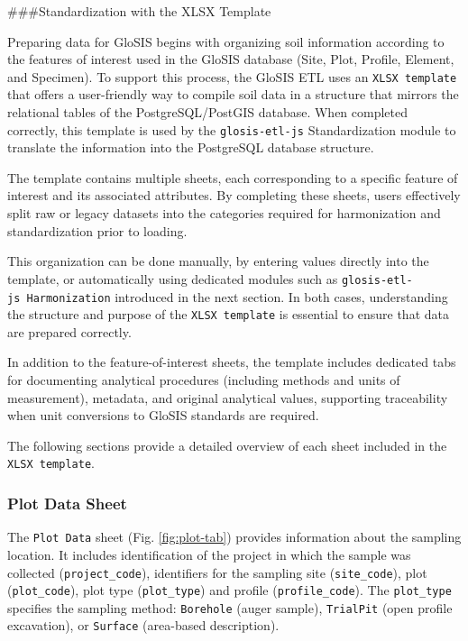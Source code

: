 \documentclass[
  10pt,
  b5paper,
  oneside]{book}
\begin{document}
\#\#\#Standardization with the XLSX Template

Preparing data for GloSIS begins with organizing soil information according to the features of interest used in the GloSIS database (Site, Plot, Profile, Element, and Specimen). To support this process, the GloSIS ETL uses an \texttt{XLSX\ template} that offers a user-friendly way to compile soil data in a structure that mirrors the relational tables of the PostgreSQL/PostGIS database. When completed correctly, this template is used by the \texttt{glosis-etl-js} Standardization module to translate the information into the PostgreSQL database structure.

The template contains multiple sheets, each corresponding to a specific feature of interest and its associated attributes. By completing these sheets, users effectively split raw or legacy datasets into the categories required for harmonization and standardization prior to loading.

This organization can be done manually, by entering values directly into the template, or automatically using dedicated modules such as \texttt{glosis-etl-js\ Harmonization} introduced in the next section. In both cases, understanding the structure and purpose of the \texttt{XLSX\ template} is essential to ensure that data are prepared correctly.

In addition to the feature-of-interest sheets, the template includes dedicated tabs for documenting analytical procedures (including methods and units of measurement), metadata, and original analytical values, supporting traceability when unit conversions to GloSIS standards are required.

The following sections provide a detailed overview of each sheet included in the \texttt{XLSX\ template}.

\subsubsection{Plot Data Sheet}\label{plot-data-sheet}

The \texttt{Plot\ Data} sheet (Fig. \ref{fig:plot-tab}) provides information about the sampling location. It includes identification of the project in which the sample was collected (\texttt{project\_code}), identifiers for the sampling site (\texttt{site\_code}), plot (\texttt{plot\_code}), plot type (\texttt{plot\_type}) and profile (\texttt{profile\_code}). The \texttt{plot\_type} specifies the sampling method: \texttt{Borehole} (auger sample), \texttt{TrialPit} (open profile excavation), or \texttt{Surface} (area-based description).
\end{document}
